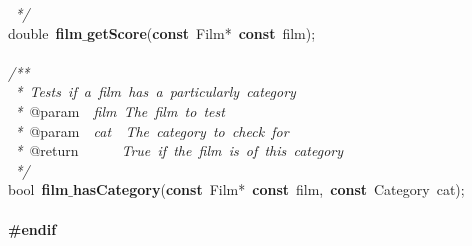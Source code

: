 \documentclass{article}
\begin{document}
\mbox{}\textit{\ */} \\
\mbox{}double\ \textbf{film$\_$getScore}(\textbf{const}\ Film*\ \textbf{const}\ film); \\
\mbox{} \\
\mbox{}\textit{/**} \\
\mbox{}\textit{\ *\ Tests\ if\ a\ film\ has\ a\ particularly\ category} \\
\mbox{}\textit{\ *\ }@param\textit{\ \ film\ The\ film\ to\ test} \\
\mbox{}\textit{\ *\ }@param\textit{\ \ cat\ \ The\ category\ to\ check\ for} \\
\mbox{}\textit{\ *\ }@return\textit{\ \ \ \ \ \ True\ if\ the\ film\ is\ of\ this\ category} \\
\mbox{}\textit{\ */} \\
\mbox{}bool\ \textbf{film$\_$hasCategory}(\textbf{const}\ Film*\ \textbf{const}\ film,\ \textbf{const}\ Category\ cat); \\
\mbox{} \\
\mbox{}\textbf{\#endif} \\
\mbox{}
\end{document}

